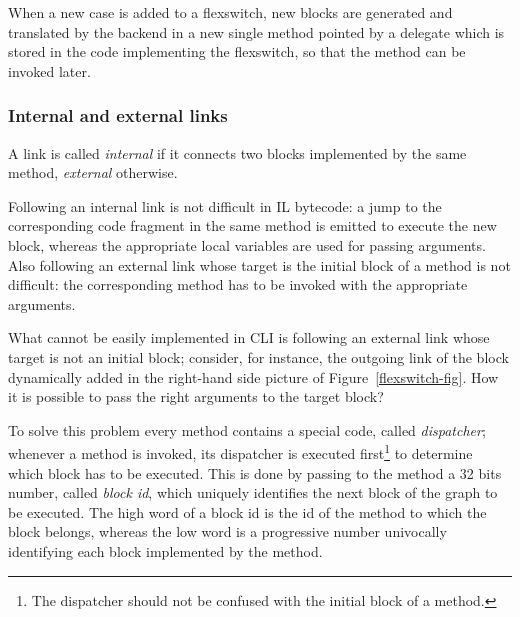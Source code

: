 When  a new case is added to a flexswitch, new blocks are generated
and translated by the backend in a new single method pointed
by a delegate which is stored in the code implementing the flexswitch,
so that the method can be invoked later.

\subsubsection{Internal and external links}

A link is called \emph{internal} if it connects two blocks implemented
by the same method,
 \emph{external} otherwise.

Following an internal link is not difficult in IL bytecode: a jump to
the corresponding code fragment in the same method is emitted 
to execute the new block, whereas the appropriate local variables are
used for passing arguments.
Also following an external link whose target is the initial block of a
method is not difficult: the corresponding method has to be invoked
with the appropriate arguments.

What cannot be easily implemented in CLI is following an external link
whose target is not an initial block; consider, for instance, the
outgoing link of the block dynamically added in the right-hand side
picture of Figure~\ref{flexswitch-fig}. How it is possible to pass the
right arguments to the target block?

To solve this problem every method contains a special code, called
\emph{dispatcher}; whenever a method is invoked, its dispatcher is
executed first\footnote{The dispatcher should not be
confused with the initial block of a method.} to
determine which block has to be executed.
This is done by passing to the method a 32 bits number, called 
\emph{block id}, which uniquely identifies the next block of the graph to be executed.
The high word of a block id is the id of the method to which the block
belongs, whereas the low word is a progressive number univocally identifying
each block implemented by the method.

